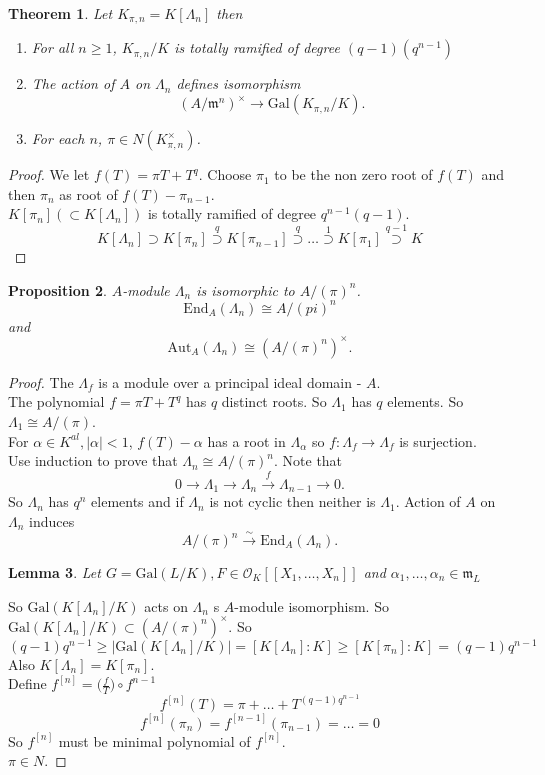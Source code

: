 \documentclass[twoside, 12pt]{iiser-thesis}
\newtheorem{thm}{Theorem}[section]
\newtheorem{prop}[thm]{ Proposition}
\newtheorem{lem}[thm]{ Lemma}
\newcommand{\gal}{\text{Gal}}
\begin{document}
\begin{thm} Let $K_{\pi, n}=K[\Lambda _n]$ then
\begin{enumerate}
    \item For all $n \geq 1$, $K_{\pi ,n }/K$ is totally ramified of degree $(q-1)(q^{n-1})$
    \item The action of $A$ on $\Lambda _n$ defines isomorphism $$(A/ \mathfrak m ^n)^\times \rightarrow \gal (K_{\pi,n}/K).$$
    \item For each $n$, $\pi \in N(K^\times_{\pi,n})$.
\end{enumerate}
\end{thm}
\begin{proof}
We let $f(T) = \pi T + T^q$. Choose $\pi _1$ to be the non zero root of $f(T)$ and then $\pi _n$ as root of $f(T) - \pi _{n-1}$. \\
$K[\pi _n] (\subset K[\Lambda _n])$ is totally ramified of degree $q^{n-1} (q-1)$.
$$ K[\Lambda _n] \supset K[\pi _n] \stackrel{q}{\supset} K[\pi _{n-1}] \stackrel{q}{\supset} \dots \stackrel{1}{\supset} K[\pi _1] \stackrel{q-1}{\supset} K$$ 
\end{proof}
\begin{prop}
$A$-module $\Lambda _n$ is isomorphic to $A/(\pi)^n$. $$\text{End}_A(\Lambda _n) \cong A/(pi)^n$$ and $$ \text{Aut}_A (\Lambda _n) \cong (A/(\pi)^n)^\times .$$
\end{prop}
\begin{proof}
The $\Lambda _f$ is a module over a principal ideal domain - $A$. \\
The polynomial $f=\pi T +T^q$ has $q$ distinct roots. So $\Lambda _1$ has $q$ elements. So $\Lambda _1 \cong A/(\pi)$. \\ For $\alpha \in K^{al} , |\alpha | <1$, $f(T) - \alpha $ has a root in $\Lambda _\alpha$ so $f : \Lambda _f \rightarrow \Lambda _f $ is surjection. \\
Use induction to prove that $\Lambda _n \cong A/(\pi )^n$.
Note that $$ 0 \rightarrow \Lambda _1 \rightarrow \Lambda _n \xrightarrow{f} \Lambda _{n-1} \rightarrow 0.$$
So $\Lambda _n$ has $q^n$ elements and if $\Lambda _n$ is not cyclic then neither is $\Lambda _1$.  Action of $A$ on $\Lambda _n$ induces $$A/(\pi)^n \xrightarrow{\sim} \text{End}_A(\Lambda _n).$$
\begin{lem}
Let $G = \gal (L/K), F \in \mathcal O_K [[X_1, \dots , X_n]]$ and $\alpha _1, \dots , \alpha _n \in \mathfrak m _L$
\end{lem}
So $\gal (K[\Lambda _n]/K) $ acts on $\Lambda _n$ s $A$-module isomorphism. So $\gal (K[\Lambda _n]/K)\subset (A/(\pi)^n)^\times$. So $$(q-1)q^{n-1} \geq |\gal(K[\Lambda _n]/K)|=[K[\Lambda _n]:K] \geq [K[\pi _n]:K]=(q-1)q^{n-1}$$
Also $K[\Lambda _n ]=K[\pi _n]$. \\
Define $f^{[n]}=\Big ( \frac{f}{T} \Big )\circ f^{n-1}$ $$f^{[n]}(T) = \pi + \dots + T^{(q-1)q^{n-1}}$$ $$f^{[n]} (\pi _n) =f^{[n-1]} (\pi _{n-1}) = \dots =0$$
So $f^{[n]}$ must be minimal polynomial of $f^{[n]}$.\\
$\pi \in N$.
\end{proof}
\end{document}
